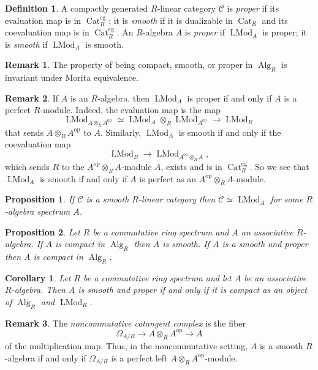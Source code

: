 \documentclass[12pt]{article}
\newtheorem{corollary}{Corollary}[subsection]
\newtheorem{proposition}{Proposition}[subsection]
\theoremstyle{definition}
\newtheorem{definition}{Definition}[subsection]
\newtheorem{remark}{Remark}[subsection]
\newcommand{\C}{\mathcal{C}}
\newcommand{\too}{\longrightarrow}
\newcommand{\op}{\mathrm{op}}
\DeclareMathOperator{\LMod}{LMod}
\DeclareMathOperator{\Alg}{Alg}
\DeclareMathOperator{\Cat}{Cat}
\begin{document}
\begin{definition}
A compactly generated $R$-linear category $\C$ is {\em proper} if its evaluation map is in $\Cat_{R}^{\mathrm{cg}}$; it is {\em smooth} if it is dualizable in $\Cat_R$ and its  coevaluation map is in $\Cat_{R}^{\mathrm{cg}}$.
An $R$-algebra $A$ is {\em proper} if $\LMod_A$ is proper; it is {\em smooth} if $\LMod_A$ is smooth.
\end{definition}

\begin{remark}
The property of being compact, smooth, or proper in $\Alg_R$ is invariant under Morita equivalence.
\end{remark}
\begin{remark}
If $A$ is an $R$-algebra, then $\LMod_A$ is proper if and only if $A$ is a perfect
$R$-module. Indeed,  the evaluation map is the map
\begin{equation*}
\LMod_{A\otimes_R A^{\op}}\simeq\LMod_A\otimes_R\LMod_{A^{\op}}\longrightarrow\LMod_R
\end{equation*}
that sends $A\otimes_R A^{\op}$ to $A$.
Similarly,
$\LMod_A$ is smooth if and only if the coevaluation map
\[
\LMod_R\longrightarrow\LMod_{A^{\op}\otimes_R A},
\]
which sends $R$ to the
$A^{\op}\otimes_R A$-module $A$, exists and is in
$\Cat_{R}^{\mathrm{cg}}$. So we see that $\LMod_A$ is smooth if and only
if $A$ is perfect as an $A^{\op}\otimes_R A$-module.
\end{remark}
\begin{proposition}{\em \cite[Lemma 3.9]{AG14}}
If $\C$ is a smooth $R$-linear category then $\C\simeq\LMod_A$ for some $R$-algebra spectrum $A$.
\end{proposition}


\begin{proposition}{\em \cite[Proposition 7.3.5.8]{HA}}
Let $R$ be a commutative ring spectrum and $A$ an associative $R$-algebra.
If $A$ is compact in $\Alg_R$ then $A$ is smooth.
If $A$ is a smooth and proper then A is compact in $\Alg_R$.
\end{proposition}

\begin{corollary}{\em \cite[Corollary 7.3.5.9]{HA}}
Let $R$ be a commutative ring spectrum and let $A$ be an associative $R$-algebra.
Then A is smooth and proper if and only if it is compact as an object of $\Alg_R$ and $\LMod_R$.
\end{corollary}
\begin{remark}
The {\em noncommutative cotangent complex} is the fiber
\[
\Omega_{A/R}\too A\otimes_R A^{\op}\too A
\]
of the multiplication map.
Thus, in the noncommutative setting, $A$ is a smooth $R$-algebra if and only if $\Omega_{A/R}$ is a perfect left $A\otimes_R A^{\op}$-module.
\end{remark}
\end{document}
